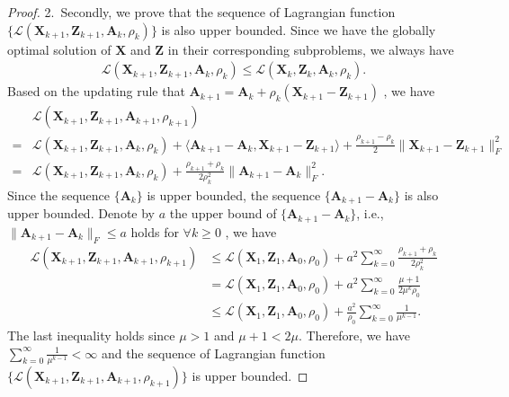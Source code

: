 \begin{proof}
2.\ Secondly, we prove that the sequence of Lagrangian function $\{\mathcal{L}(\bm{X}_{k+1},\bm{Z}_{k+1},\bm{A}_{k},\rho_{k})\}$ is also upper bounded. Since we have the globally optimal solution of $\bm{X}$ and $\bm{Z}$ in their corresponding subproblems, we always have 
\begin{align}
\mathcal{L}(\bm{X}_{k+1},\bm{Z}_{k+1},\bm{A}_{k},\rho_{k})
\le
\mathcal{L}(\bm{X}_{k},\bm{Z}_{k},\bm{A}_{k},\rho_{k}).
\end{align}
Based on the updating rule that 
$
\bm{A}_{k+1}
=
\bm{A}_{k} + \rho_{k}(\bm{X}_{k+1}-\bm{Z}_{k+1})
$
,
we have 
\begin{align}
&
\mathcal{L}(\bm{X}_{k+1},\bm{Z}_{k+1},\bm{A}_{k+1},\rho_{k+1})
\\
=
&
\mathcal{L}(\bm{X}_{k+1},\bm{Z}_{k+1},\bm{A}_{k},\rho_{k})
+
\langle
\bm{A}_{k+1}
-
\bm{A}_{k}
,
\bm{X}_{k+1}
-
\bm{Z}_{k+1}
\rangle
+
\frac{\rho_{k+1}-\rho_{k}}{2}
\|
\bm{X}_{k+1}-\bm{Z}_{k+1}
\|_{F}^{2}
\\
=
&
\mathcal{L}(\bm{X}_{k+1},\bm{Z}_{k+1},\bm{A}_{k},\rho_{k})
+
\frac{\rho_{k+1}+\rho_{k}}{2\rho_{k}^{2}}
\|
\bm{A}_{k+1}
-
\bm{A}_{k}
\|_{F}^{2}.
\end{align}
Since the sequence 
$\{
\bm{A}_{k}\}$
is upper bounded, the sequence 
$\{
\bm{A}_{k+1}
-
\bm{A}_{k}
\}$ is also upper bounded. Denote by $a$ the upper bound of 
$\{
\bm{A}_{k+1}
-
\bm{A}_{k}
\}$, 
i.e., 
$
\|
\bm{A}_{k+1}
-
\bm{A}_{k}
\|_{F}\le a
$
holds for
$\forall k\ge0$
,
we have 
\begin{align}
\mathcal{L}(\bm{X}_{k+1},\bm{Z}_{k+1},\bm{A}_{k+1},\rho_{k+1})
&
\le
\mathcal{L}(\bm{X}_{1},\bm{Z}_{1},\bm{A}_{0},\rho_{0})
+
a^2\sum_{k=0}^{\infty}\frac{\rho_{k+1}+\rho_{k}}{2\rho_{k}^{2}}
\\
&
=
\mathcal{L}(\bm{X}_{1},\bm{Z}_{1},\bm{A}_{0},\rho_{0})
+
a^2\sum_{k=0}^{\infty}\frac{\mu+1}{2\mu^{k}\rho_{0}}
\\
&
\le
\mathcal{L}(\bm{X}_{1},\bm{Z}_{1},\bm{A}_{0},\rho_{0})
+
\frac{a^2}{\rho_{0}}\sum_{k=0}^{\infty}\frac{1}{\mu^{k-1}}.
\end{align}
The last inequality holds since $\mu>1$ and $\mu+1<2\mu$. Therefore, we have $\sum_{k=0}^{\infty}\frac{1}{\mu^{k-1}}<\infty$ and the sequence of Lagrangian function 
$\{\mathcal{L}(\bm{X}_{k+1},\bm{Z}_{k+1},\bm{A}_{k+1},\rho_{k+1})\}$
is upper bounded.


\end{proof}
